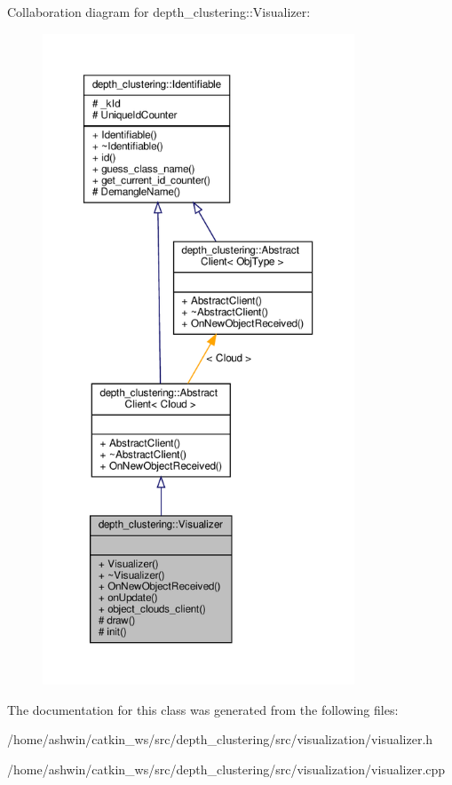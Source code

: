 Collaboration diagram for depth\+\_\+clustering\+:\+:Visualizer\+:\nopagebreak
\begin{figure}[H]
\begin{center}
\leavevmode
\includegraphics[height=550pt]{classdepth__clustering_1_1Visualizer__coll__graph}
\end{center}
\end{figure}


The documentation for this class was generated from the following files\+:\begin{DoxyCompactItemize}
\item 
/home/ashwin/catkin\+\_\+ws/src/depth\+\_\+clustering/src/visualization/visualizer.\+h\item 
/home/ashwin/catkin\+\_\+ws/src/depth\+\_\+clustering/src/visualization/visualizer.\+cpp\end{DoxyCompactItemize}
